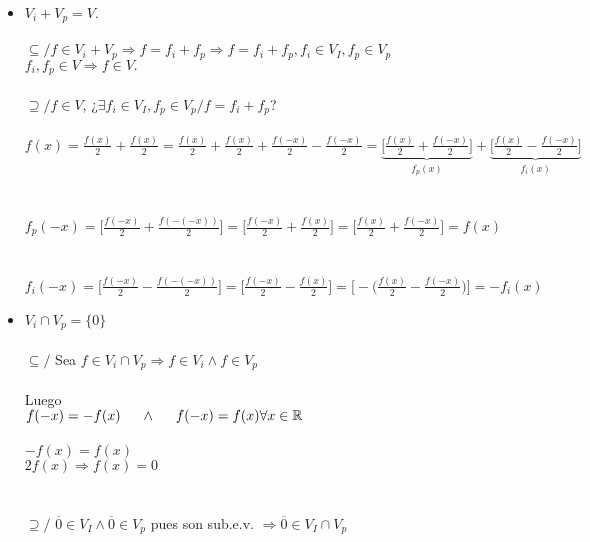 \documentclass{article}
\begin{document}
\begin{itemize}
	\item
		$V_i + V_p = V$. \\ \\
		$\subseteq / f \in V_i+V_p \Rightarrow f = f_i + f_p \Rightarrow f = f_i + f_p, f_i \in V_I, f_p \in V_p$
		\\
		$f_i,f_p \in V \Rightarrow f \in V.$ \\ \\
		$\supseteq / f \in V$, ¿$\exists f_i \in V_I,f_p \in V_p / f=f_i+f_p$? \\ \\
		$f(x) = \displaystyle \frac{f(x)}{2} + \frac{f(x)}{2} = \frac{f(x)}{2} + \frac{f(x)}{2} + \frac{f(-x)}{2}
		- \frac{f(-x)}{2} = \underbrace{\Big[ \frac{f(x)}{2} + \frac{f(-x)}{2} \Big]}_{f_p(x)} 
		+ \underbrace{\Big[ \frac{f(x)}{2} - \frac{f(-x)}{2} \Big]}_{f_i(x)}$ \\ \\ \\
		$f_p(-x) = \displaystyle \Big[ \frac{f(-x)}{2} + \frac{f(-(-x))}{2} \Big] = 
		\Big[ \frac{f(-x)}{2} + \frac{f(x)}{2} \Big] = \Big[ \frac{f(x)}{2} + \frac{f(-x)}{2} \Big] = f(x)$
		\\ \\ \\
		$f_i(-x) = \displaystyle \Big[ \frac{f(-x)}{2} - \frac{f(-(-x))}{2} \Big] = 
		\Big[ \frac{f(-x)}{2} - \frac{f(x)}{2} \Big] = \Big[ - \Big( \frac{f(x)}{2} - \frac{f(-x)}{2} \Big) \Big]
		= -f_i(x)$
	\item
		$V_i \cap V_p = \Big\{ 0 \Big\}$ \\ \\
		$\subseteq /$ Sea $f \in V_i \cap V_p \Rightarrow f \in V_i \wedge f \in V_p$ \\ \\
		Luego \\
		\hspace*{1cm} $f(-x)=-f(x) \hspace*{0.5cm} \wedge \hspace*{0.5cm} f(-x) = f(x) \forall x \in \mathbb{R}$ \\ \\
		\hspace*{1cm} $-f(x) = f(x)$ \\
		\hspace*{1cm} $2f(x) \Rightarrow f(x) = 0$ \\ \\
		\\
		$\supseteq /$ $\overline{0} \in V_I \wedge \overline{0} \in V_p$ pues son sub.e.v. 
		$\Rightarrow \overline{0} \in V_I \cap V_p$ 
\end{itemize}
\end{document}

